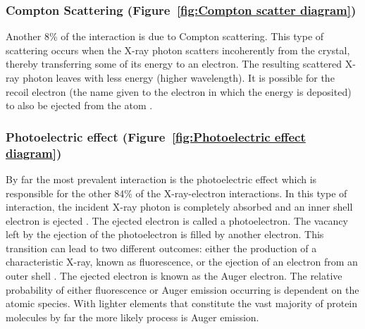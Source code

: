         \subsubsection{Compton Scattering (Figure~\ref{fig:Compton scatter diagram})}
        \label{subs:Compton Scattering}
            Another 8\% of the interaction is due to Compton scattering. This type of scattering occurs when the X-ray photon scatters incoherently from the crystal, thereby transferring some of its energy to an electron.
            The resulting scattered X-ray photon leaves with less energy (higher wavelength). It is possible for the recoil electron (the name given to the electron in which the energy is deposited) to also be ejected from the atom \cite{nave1995}.

        \subsubsection{Photoelectric effect (Figure~\ref{fig:Photoelectric effect diagram})}
        \label{subs:Photoelectric effect}
            By far the most prevalent interaction is the photoelectric effect which is responsible for the other 84\% of the X-ray-electron interactions.
            In this type of interaction, the incident X-ray photon is completely absorbed and an inner shell electron is ejected \cite{garman2010}.
            The ejected electron is called a photoelectron. The vacancy left by the ejection of the photoelectron is filled by another electron.
            This transition can lead to two different outcomes: either the production of a characteristic X-ray, known as fluorescence, or the ejection of an electron from an outer shell \cite{nave1995}.
            The ejected electron is known as the Auger electron. The relative probability of either fluorescence or Auger emission occurring is dependent on the atomic species.
            With lighter elements that constitute the vast majority of protein molecules by far the more likely process is Auger emission.

